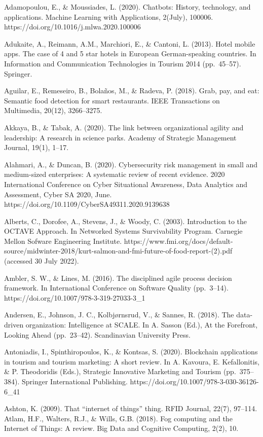 \documentclass[
  letterpaper,
  DIV=11,
  numbers=noendperiod]{scrreprt}
\begin{document}
Adamopoulou, E., \& Moussiades, L. (2020). Chatbots: History,
technology, and applications. Machine Learning with Applications,
2(July), 100006. https://doi.org/10.1016/j.mlwa.2020.100006

Adukaite, A., Reimann, A.M., Marchiori, E., \& Cantoni, L. (2013). Hotel
mobile apps. The case of 4 and 5 star hotels in European German-speaking
countries. In Information and Communication Technologies in Tourism 2014
(pp.~45--57). Springer.

Aguilar, E., Remeseiro, B., Bolaños, M., \& Radeva, P. (2018). Grab,
pay, and eat: Semantic food detection for smart restaurants. IEEE
Transactions on Multimedia, 20(12), 3266--3275.

Akkaya, B., \& Tabak, A. (2020). The link between organizational agility
and leadership: A research in science parks. Academy of Strategic
Management Journal, 19(1), 1--17.

Alahmari, A., \& Duncan, B. (2020). Cybersecurity risk management in
small and medium-sized enterprises: A systematic review of recent
evidence. 2020 International Conference on Cyber Situational Awareness,
Data Analytics and Assessment, Cyber SA 2020, June.
https://doi.org/10.1109/CyberSA49311.2020.9139638

Alberts, C., Dorofee, A., Stevens, J., \& Woody, C. (2003). Introduction
to the OCTAVE Approach. In Networked Systems Survivability Program.
Carnegie Mellon Sofware Engineering Institute.
https://www.fmi.org/docs/default-source/midwinter-2018/kurt-salmon-and-fmi-future-of-food-report-(2).pdf
(accessed 30 July 2022).

Ambler, S. W., \& Lines, M. (2016). The disciplined agile process
decision framework. In International Conference on Software Quality
(pp.~3--14). https://doi.org/10.1007/978-3-319-27033-3\_1

Andersen, E., Johnson, J. C., Kolbjørnsrud, V., \& Sannes, R. (2018).
The data-driven organization: Intelligence at SCALE. In A. Sasson (Ed.),
At the Forefront, Looking Ahead (pp.~23--42). Scandinavian University
Press.

Antoniadis, I., Spinthiropoulos, K., \& Kontsas, S. (2020). Blockchain
applications in tourism and tourism marketing: A short review. In A.
Kavoura, E. Kefallonitis, \& P. Theodoridis (Eds.), Strategic Innovative
Marketing and Tourism (pp.~375--384). Springer International Publishing.
https://doi.org/10.1007/978-3-030-36126-6\_41

Ashton, K. (2009). That ``internet of things'' thing. RFID Journal,
22(7), 97--114. Atlam, H.F., Walters, R.J., \& Wills, G.B. (2018). Fog
computing and the Internet of Things: A review. Big Data and Cognitive
Computing, 2(2), 10.
\end{document}

